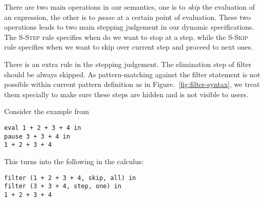 There are two main operations in our semantics, one is to \emph{skip} the
evaluation of an expression, the other is to \emph{pause} at a certain point of
evaluation. These two operations leads to two main stepping judgement in our
dynamic specifications. The \textsc{S-Step} rule specifies when do we want to
stop at a step, while the \textsc{S-Skip} rule specifies when we want to skip over
current step and proceed to next ones.

There is an extra rule in the stepping judgement. The elimination step of filter
should be always skipped. As pattern-matching against the filter statement is
not possible within current pattern definition as in
Figure.~\ref{fig:filter-syntax}, we treat them specially to make sure these
steps are hidden and is not visible to users.


Consider the example from 

\begin{lstlisting}
eval 1 + 2 + 3 + 4 in 
pause 3 + 3 + 4 in 
1 + 2 + 3 + 4
\end{lstlisting}

This turns into the following in the calculus:
\begin{lstlisting}
filter (1 + 2 + 3 + 4, skip, all) in
filter (3 + 3 + 4, step, one) in 
1 + 2 + 3 + 4
\end{lstlisting}

